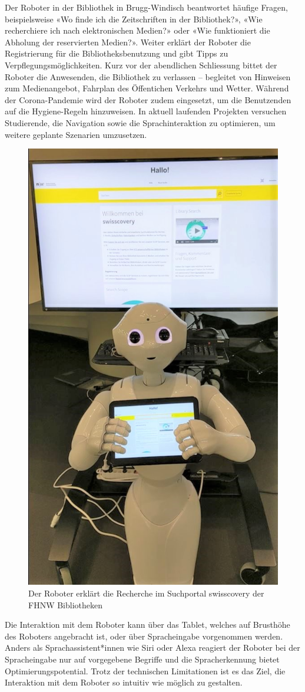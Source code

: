 \documentclass[a4paper,
fontsize=11pt,
oneside,
numbers=noperiodatend,
parskip=half-,
bibliography=totoc,
final
]{scrartcl}
\begin{document}
Der Roboter in der Bibliothek in Brugg-Windisch beantwortet häufige
Fragen, beispielsweise «Wo finde ich die Zeitschriften in der
Bibliothek?», «Wie recherchiere ich nach elektronischen Medien?» oder
«Wie funktioniert die Abholung der reservierten Medien?». Weiter erklärt
der Roboter die Registrierung für die Bibliotheksbenutzung und gibt
Tipps zu Verpflegungsmöglichkeiten. Kurz vor der abendlichen Schliessung
bittet der Roboter die Anwesenden, die Bibliothek zu verlassen --
begleitet von Hinweisen zum Medienangebot, Fahrplan des Öffentichen
Verkehrs und Wetter. Während der Corona-Pandemie wird der Roboter zudem
eingesetzt, um die Benutzenden auf die Hygiene-Regeln hinzuweisen. In
aktuell laufenden Projekten versuchen Studierende, die Navigation sowie
die Sprachinteraktion zu optimieren, um weitere geplante Szenarien
umzusetzen.

\begin{figure}
\centering
\includegraphics[width=.5\textwidth]{img/Schulungen_swisscovery1.jpg}
\caption{Der Roboter erklärt die Recherche im Suchportal
swisscovery der FHNW Bibliotheken}
\end{figure}

Die Interaktion mit dem Roboter kann über das Tablet, welches auf
Brusthöhe des Roboters angebracht ist, oder über Spracheingabe
vorgenommen werden. Anders als Sprachassistent*innen wie Siri oder Alexa
reagiert der Roboter bei der Spracheingabe nur auf vorgegebene Begriffe
und die Spracherkennung bietet Optimierungspotential. Trotz der
technischen Limitationen ist es das Ziel, die Interaktion mit dem
Roboter so intuitiv wie möglich zu gestalten.
\end{document}
